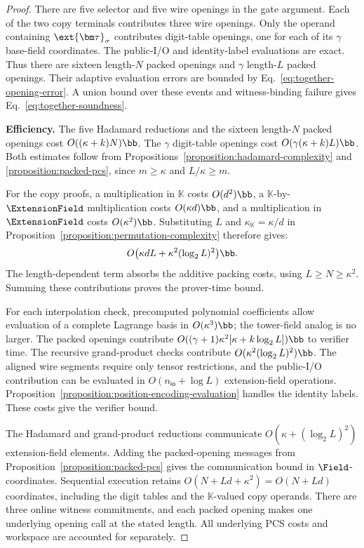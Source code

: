 \begin{proof}
There are five selector and five wire openings in the gate
argument. Each of the two copy terminals contributes three
wire openings. Only the operand containing
\(\ext{\bm\tau}_\sigma\) contributes digit-table openings,
one for each of its \(\gamma\) base-field coordinates.
The public-I/O and identity-label evaluations are exact.
Thus there are sixteen length-\(N\) packed openings and
\(\gamma\) length-\(L\) packed openings.
Their adaptive evaluation errors are bounded by
Eq.~\eqref{eq:together-opening-error}.
A union bound over these events and witness-binding failure
gives Eq.~\eqref{eq:together-soundness}.

\noindent\textbf{Efficiency.}
The five Hadamard reductions and the sixteen length-\(N\)
packed openings cost \(O((\kappa+k)N)\bb\).
The \(\gamma\) digit-table openings cost
\(O(\gamma(\kappa+k)L)\bb\).
Both estimates follow from
Propositions~\ref{proposition:hadamard-complexity} and
\ref{proposition:packed-pcs}, since \(m\geq\kappa\) and
\(L/\kappa\geq m\).

For the copy proofs, a multiplication in \(\mathbb K\) costs
\(O(d^2)\bb\), a \(\mathbb K\)-by-\(\ExtensionField\)
multiplication costs \(O(\kappa d)\bb\), and a multiplication
in \(\ExtensionField\) costs \(O(\kappa^2)\bb\).
Substituting \(L\) and \(\kappa_{\mathbb K}=\kappa/d\)
in Proposition~\ref{proposition:permutation-complexity}
therefore gives:
\[
    O\bigl(\kappa dL+\kappa^2(\log_2L)^2\bigr)\bb.
\]
The length-dependent term absorbs the additive packing costs,
using \(L\geq N\geq\kappa^2\).
Summing these contributions proves the prover-time bound.

For each interpolation check, precomputed polynomial coefficients
allow evaluation of a complete Lagrange basis in
\(O(\kappa^3)\bb\); the tower-field analog is no larger.
The packed openings contribute
\(O((\gamma+1)\kappa^2[\kappa+k\log_2L])\bb\)
to verifier time.
The recursive grand-product checks contribute
\(O(\kappa^2(\log_2L)^2)\bb\).
The aligned wire segments require only tensor restrictions,
and the public-I/O contribution can be evaluated in
\(O(n_{\mathsf{io}}+\log L)\) extension-field operations.
Proposition~\ref{proposition:position-encoding-evaluation}
handles the identity labels. These costs give the verifier bound.

The Hadamard and grand-product reductions communicate
\(O(\kappa+(\log_2L)^2)\) extension-field elements.
Adding the packed-opening messages from
Proposition~\ref{proposition:packed-pcs} gives the communication
bound in \(\Field\)-coordinates.
Sequential execution retains \(O(N+Ld+\kappa^2)=O(N+Ld)\)
coordinates, including the digit tables and the
\(\mathbb K\)-valued copy operands.
There are three online witness commitments, and each packed
opening makes one underlying opening call at the stated length.
All underlying PCS costs and workspace are accounted for separately.
\end{proof}

